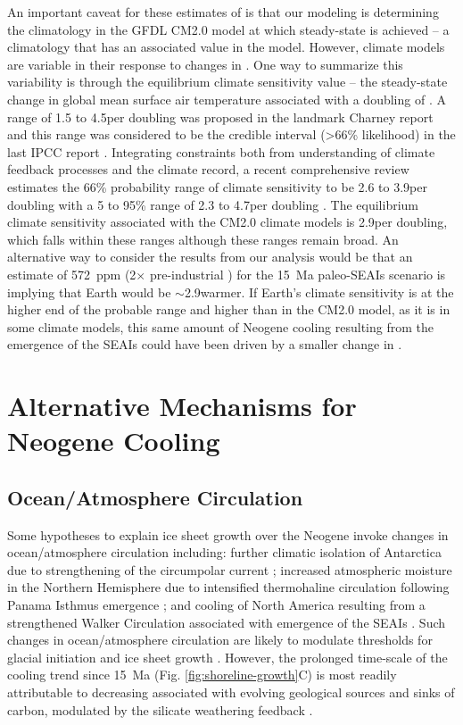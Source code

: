 An important caveat for these estimates of \pCOtwo is that our modeling is determining the climatology in the GFDL CM2.0 model at which steady-state is achieved -- a climatology that has an associated \pCOtwo value in the model. However, climate models are variable in their response to changes in \pCOtwo. One way to summarize this variability is through the equilibrium climate sensitivity value -- the steady-state change in global mean surface air temperature associated with a doubling of \pCOtwo. A range of 1.5 to 4.5\degreesC per \pCOtwo doubling was proposed in the landmark Charney report \citep{Charney1979a} and this range was considered to be the credible interval (\textgreater66\% likelihood) in the last IPCC report \citep{Stocker2013a}. Integrating constraints both from understanding of climate feedback processes and the climate record, a recent comprehensive review estimates the 66\% probability range of climate sensitivity to be 2.6 to 3.9\degreesC per \pCOtwo doubling with a 5 to 95\% range of 2.3 to 4.7\degreesC per \pCOtwo doubling \citep{Sherwood2020a}. The equilibrium climate sensitivity associated with the CM2.0 climate models is 2.9\degreesC per \pCOtwo doubling, which falls within these ranges although these ranges remain broad. An alternative way to consider the results from our analysis would be that an estimate of 572~ppm (2$\times$ pre-industrial \pCOtwo) for the 15~Ma paleo-SEAIs scenario is implying that Earth would be $\sim$2.9\degreesC warmer. If Earth's climate sensitivity is at the higher end of the probable range and higher than in the CM2.0 model, as it is in some climate models, this same amount of Neogene cooling resulting from the emergence of the SEAIs could have been driven by a smaller change in \pCOtwo.

\section{Alternative Mechanisms for Neogene Cooling}

\subsection{Ocean/Atmosphere Circulation}

Some hypotheses to explain ice sheet growth over the Neogene invoke changes in ocean/atmosphere circulation including: further climatic isolation of Antarctica due to strengthening of the circumpolar current \citep{Shevenell2004a}; increased atmospheric moisture in the Northern Hemisphere due to intensified thermohaline circulation following Panama Isthmus emergence \citep{Haug1998a}; and cooling of North America resulting from a strengthened Walker Circulation associated with emergence of the SEAIs \citep{Molnar2015a}. Such changes in ocean/atmosphere circulation are likely to modulate \pCOtwo thresholds for glacial initiation and ice sheet growth \citep{DeConto2008a}. However, the prolonged time-scale of the cooling trend since 15~Ma (Fig. \ref{fig:shoreline-growth}C) is most readily attributable to decreasing \pCOtwo associated with evolving geological sources and sinks of carbon, modulated by the silicate weathering feedback \citep{Walker1981a, Raymo1991a, Berner1997a, Kump1997a, Berner2001a}.

